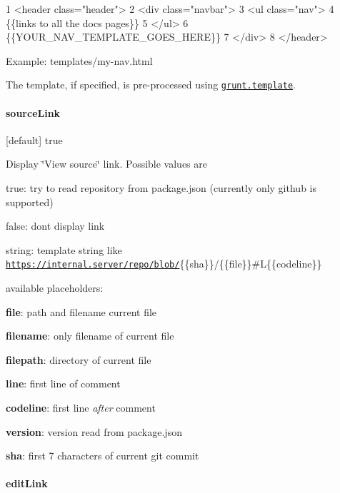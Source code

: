 \begin{DoxyCode}
1 <header class="header">
2   <div class="navbar">
3     <ul class="nav">
4       \{\{links to all the docs pages\}\}
5     </ul>
6     \{\{YOUR\_NAV\_TEMPLATE\_GOES\_HERE\}\}
7   </div>
8 </header>
\end{DoxyCode}
 Example\+: \textquotesingle{}templates/my-\/nav.\+html\textquotesingle{}

The template, if specified, is pre-\/processed using \href{https://github.com/gruntjs/grunt/wiki/grunt.template#grunttemplateprocess}{\tt grunt.\+template}.

\paragraph*{source\+Link}

\mbox{[}default\mbox{]} true

Display \char`\"{}\+View source\char`\"{} link. Possible values are


\begin{DoxyItemize}
\item {\ttfamily true}\+: try to read repository from package.\+json (currently only github is supported)
\item {\ttfamily false}\+: don\textquotesingle{}t display link
\item string\+: template string like {\ttfamily \textquotesingle{}\href{https://internal.server/repo/blob/}{\tt https\+://internal.\+server/repo/blob/}\{\{sha\}\}/\{\{file\}\}\#\+L\{\{codeline\}\}\textquotesingle{}}

available placeholders\+:
\begin{DoxyItemize}
\item {\bfseries file}\+: path and filename current file
\item {\bfseries filename}\+: only filename of current file
\item {\bfseries filepath}\+: directory of current file
\item {\bfseries line}\+: first line of comment
\item {\bfseries codeline}\+: first line {\itshape after} comment
\item {\bfseries version}\+: version read from package.\+json
\item {\bfseries sha}\+: first 7 characters of current git commit
\end{DoxyItemize}
\end{DoxyItemize}

\paragraph*{edit\+Link}

